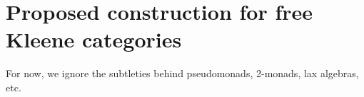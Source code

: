 \documentclass[acmsmall,anonymous,review,screen]{acmart}
\begin{document}
\begin{comment}
  We define the DFA with relation $(X, \mathcal{S}^*)$, where
  $\mathcal{S} = \{ (x_1, x_2) \mid f(x_1) \mathcal{S} f(x_2)\}$.
  We now prove that $\mathcal{S}^*$ is a simulation relation.
  \begin{description}
  \item[Preorder:] It follows directly from the fact that $\mathcal{S}$
    is a preorder.
  \item[Preserves acceptance:] Assume that $f(x_1) \mathcal{S} f(x_2)$
    and that $x_1$ is an accepting state. Since $f$ is a DFA morphism,
    it follows that $f(x)$ is an accepting state if, and only if, $x$
    is accepting. Since by assumption $\mathcal{S}$ is a simulation
    relation, we can conclude that $f(x_2)$ is an accepting state and
    so is $x_2$.
  \item[Stable under transition:] Assume that $f(x_1) \mathcal{S} f(x_2)$,
    $\delta_a(x_1) = x'_1$ and $\delta_a(x_2) = x'_2$. We want to
    show that $f(x'_1) \mathcal{S} f(x'_2)$. By assumption that $f$ is
    a DFA morphism, we have $f \circ \delta_a = \delta'_a \circ f$,
    for every character $a : \Sigma$. Therefore, we have to prove that
    $\delta'_a(f(x_1)) \mathcal{S} \delta'_a(f(x_2))$. This follows
    by the assumption that $\mathcal{S}$ is a simulation relation.
  \end{description}

  Therefore $(X, \mathcal{S}^*)$ is indeed a lifting of $X$.
  Showing that it is the Cartesian lifting follows by unfolding
  the definitions and using the fact that $U$ is faithful.
\end{proof}
\end{comment}

\section{Proposed construction for free Kleene categories}

For now, we ignore the subtleties behind pseudomonads, 2-monads,
lax algebras, etc.
\end{document}
